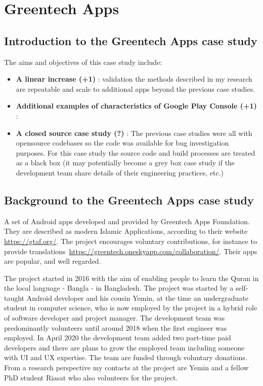 \section{Greentech Apps}

\subsection{Introduction to the Greentech Apps case study}
The aims and objectives of this case study include:

\begin{itemize}
    \item \textbf{A linear increase (+1)} : validation the methods described in my research are repeatable and scale to additional apps beyond the previous case studies.
    \item \textbf{Additional examples of characteristics of Google Play Console (+1)} :
    \item \textbf{A closed source case study (?)} : The previous case studies were all with opensource codebases so the code was available for bug investigation purposes. For this case study the source code and build processes are treated as a black box (it may potentially become a grey box case study if the development team share details of their engineering practices, etc.)
\end{itemize}

\subsection{Background to the Greentech Apps case study}
A set of Android apps developed and provided by Greentech Apps Foundation. They are described as modern Islamic Applications, according to their website \url{https://gtaf.org/}. The project encourages voluntary contributions, for instance to provide translations~\url{https://greentech.oneskyapp.com/collaboration/}. Their apps are popular, and well regarded. %


The project started in 2016 with the aim of enabling people to learn the Quran in the local language - Bangla - in Bangladesh. The project was started by a self-taught Android developer and his cousin Yemin, at the time an undergraduate student in computer science, who is now employed by the project in a hybrid role of software developer and project manager. The development team was predominantly volunteers until around 2018 when the first engineer was employed. In April 2020 the development team added two part-time paid developers and there are plans to grow the employed team including someone with UI and UX expertise. The team are funded through voluntary donations. From a research perspective my contacts at the project are Yemin and a fellow PhD student Riasat who also volunteers for the project.

